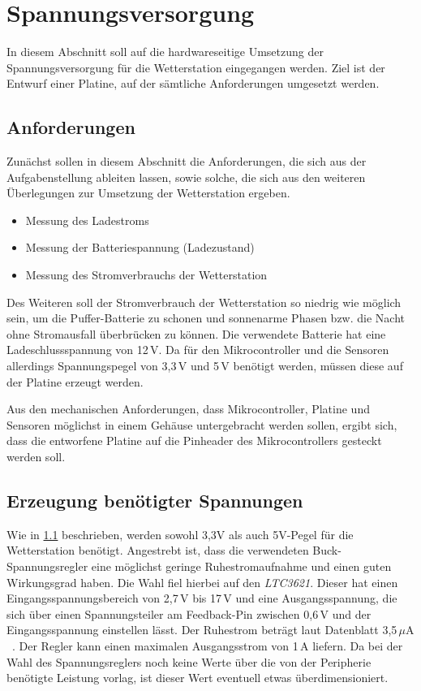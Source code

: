 \section{Spannungsversorgung}\label{sec.spannungsversorgung}
In diesem Abschnitt soll auf die hardwareseitige Umsetzung der Spannungsversorgung für die Wetterstation eingegangen werden. Ziel ist der Entwurf einer Platine, auf der sämtliche Anforderungen umgesetzt werden.

\subsection{Anforderungen}\label{subsec.anforderungen}
Zunächst sollen in diesem Abschnitt die Anforderungen, die sich aus der Aufgabenstellung ableiten lassen, sowie solche, die sich aus den weiteren Überlegungen zur Umsetzung der Wetterstation ergeben.

\begin{itemize}

	\item Messung des Ladestroms
	\item Messung der Batteriespannung (Ladezustand)
	\item Messung des Stromverbrauchs der Wetterstation

\end{itemize}

Des Weiteren soll der Stromverbrauch der Wetterstation so niedrig wie möglich sein, um die Puffer-Batterie zu schonen und sonnenarme Phasen bzw. die Nacht ohne Stromausfall überbrücken zu können. Die verwendete Batterie hat eine Ladeschlussspannung von 12\,V. Da für den Mikrocontroller und die Sensoren allerdings Spannungspegel von 3,3\,V und 5\,V benötigt werden, müssen diese auf der Platine erzeugt werden.

Aus den mechanischen Anforderungen, dass Mikrocontroller, Platine und Sensoren möglichst in einem Gehäuse untergebracht werden sollen, ergibt sich, dass die entworfene Platine auf die Pinheader des Mikrocontrollers gesteckt werden soll.

\subsection{Erzeugung benötigter Spannungen}\label{subsec.Spannungserzeugung}
Wie in \ref{subsec.anforderungen} beschrieben, werden sowohl 3,3V als auch 5V-Pegel für die Wetterstation benötigt. Angestrebt ist, dass die verwendeten Buck-Spannungsregler eine möglichst geringe Ruhestromaufnahme und einen guten Wirkungsgrad haben. Die Wahl fiel hierbei auf den \textit{LTC3621}. Dieser hat einen Eingangsspannungsbereich von 2,7\,V bis 17\,V und eine Ausgangsspannung, die sich über einen Spannungsteiler am Feedback-Pin zwischen 0,6\,V und der Eingangsspannung einstellen lässt. Der Ruhestrom beträgt laut Datenblatt 3,5\,$\mu$A ~\cite{ltc3621}. Der Regler kann einen maximalen Ausgangsstrom von 1\,A liefern. Da bei der Wahl des Spannungsreglers noch keine Werte über die von der Peripherie benötigte Leistung vorlag, ist dieser Wert eventuell etwas überdimensioniert.

